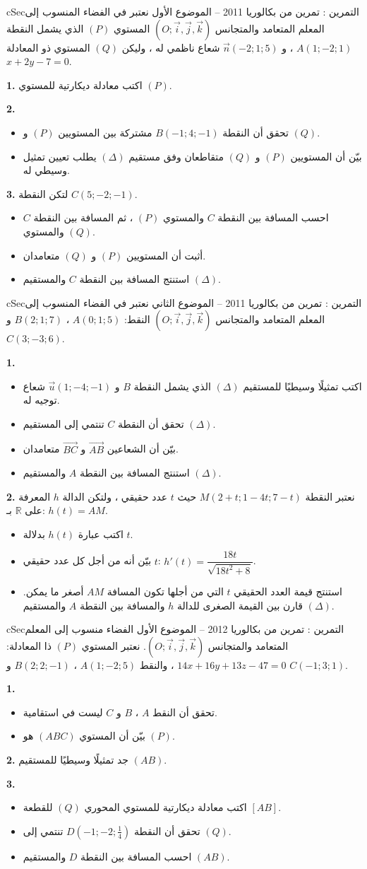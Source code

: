 \documentclass[12pt,a4paper]{article}
\newenvironment{BOX}[2]{\begin{otherlanguage}{english}\begin{arbox}{#1}{#2}}{\end{arbox}\end{otherlanguage}}
\newcounter{exo}
\newenvironment{tamrin}[1]{\stepcounter{exo}\begin{BOX}{cSec}{التمرين \theexo: #1}}{\end{BOX}}
\newcommand{\R}{\mathbb{R}}
\newenvironment{sq}{\begin{itemize}[leftmargin=2.4em,itemsep=3pt]}{\end{itemize}}
\newcommand{\qa}{\item[(أ)]}\newcommand{\qb}{\item[(ب)]}\newcommand{\qc}{\item[(جـ)]}\newcommand{\qd}{\item[(د)]}\newcommand{\qe}{\item[(هـ)]}
\newcommand{\QQ}[1]{\par\smallskip\textbf{#1.} }
\newcommand{\V}[1]{\overrightarrow{#1}}
\newcommand{\Rep}{(O;\vec i,\vec j,\vec k)}
\begin{document}
\begin{tamrin}{تمرين من بكالوريا 2011 -- الموضوع الأول}
نعتبر في الفضاء المنسوب إلى المعلم المتعامد والمتجانس $\Rep$ المستوي $(P)$ الذي يشمل النقطة $A(1;-2;1)$ ، و $\vec n(-2;1;5)$ شعاع ناظمي له ، وليكن $(Q)$ المستوي ذو المعادلة $x+2y-7=0$.
\QQ{1} اكتب معادلة ديكارتية للمستوي $(P)$.
\QQ{2}
\begin{sq}
\qa تحقق أن النقطة $B(-1;4;-1)$ مشتركة بين المستويين $(P)$ و $(Q)$.
\qb بيّن أن المستويين $(P)$ و $(Q)$ متقاطعان وفق مستقيم $(\Delta)$ يطلب تعيين تمثيل وسيطي له.
\end{sq}
\QQ{3} لتكن النقطة $C(5;-2;-1)$.
\begin{sq}
\qa احسب المسافة بين النقطة $C$ والمستوي $(P)$ ، ثم المسافة بين النقطة $C$ والمستوي $(Q)$.
\qb أثبت أن المستويين $(P)$ و $(Q)$ متعامدان.
\qc استنتج المسافة بين النقطة $C$ والمستقيم $(\Delta)$.
\end{sq}
\end{tamrin}
\begin{tamrin}{تمرين من بكالوريا 2011 -- الموضوع الثاني}
نعتبر في الفضاء المنسوب إلى المعلم المتعامد والمتجانس $\Rep$ النقط: $A(0;1;5)$ ، $B(2;1;7)$ و $C(3;-3;6)$.
\QQ{1}
\begin{sq}
\qa اكتب تمثيلًا وسيطيًا للمستقيم $(\Delta)$ الذي يشمل النقطة $B$ و $\vec u(1;-4;-1)$ شعاع توجيه له.
\qb تحقق أن النقطة $C$ تنتمي إلى المستقيم $(\Delta)$.
\qc بيّن أن الشعاعين $\V{AB}$ و $\V{BC}$ متعامدان.
\qd استنتج المسافة بين النقطة $A$ والمستقيم $(\Delta)$.
\end{sq}
\QQ{2} نعتبر النقطة $M(2+t;1-4t;7-t)$ حيث $t$ عدد حقيقي ، ولتكن الدالة $h$ المعرفة على $\R$ بـ: $h(t)=AM$.
\begin{sq}
\qa اكتب عبارة $h(t)$ بدلالة $t$.
\qb بيّن أنه من أجل كل عدد حقيقي $t$: $h'(t)=\dfrac{18t}{\sqrt{18t^2+8}}$.
\qc استنتج قيمة العدد الحقيقي $t$ التي من أجلها تكون المسافة $AM$ أصغر ما يمكن. قارن بين القيمة الصغرى للدالة $h$ والمسافة بين النقطة $A$ والمستقيم $(\Delta)$.
\end{sq}
\end{tamrin}
\begin{tamrin}{تمرين من بكالوريا 2012 -- الموضوع الأول}
الفضاء منسوب إلى المعلم المتعامد والمتجانس $\Rep$. نعتبر المستوي $(P)$ ذا المعادلة: $14x+16y+13z-47=0$ ، والنقط $A(1;-2;5)$ ، $B(2;2;-1)$ و $C(-1;3;1)$.
\QQ{1}
\begin{sq}
\qa تحقق أن النقط $A$ ، $B$ و $C$ ليست في استقامية.
\qb بيّن أن المستوي $(ABC)$ هو $(P)$.
\end{sq}
\QQ{2} جد تمثيلًا وسيطيًا للمستقيم $(AB)$.
\QQ{3}
\begin{sq}
\qa اكتب معادلة ديكارتية للمستوي المحوري $(Q)$ للقطعة $[AB]$.
\qb تحقق أن النقطة $D\left(-1;-2;\frac14\right)$ تنتمي إلى $(Q)$.
\qc احسب المسافة بين النقطة $D$ والمستقيم $(AB)$.
\end{sq}
\end{tamrin}
\end{document}
